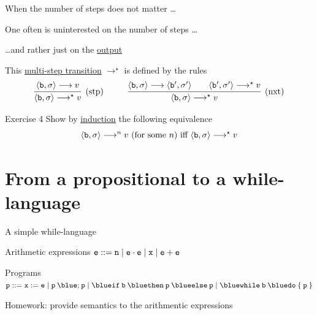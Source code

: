 \documentclass{beamer}
\begin{document}
\begin{frame}{When the number of steps does not matter \dots}

        One often is uninterested on the number of steps \dots

        \dots and rather just on the \alert{\underline{output}}

        \pause
        \bigskip
        This \alert{\underline{multi-step transition}}  $\longrightarrow^\star$
        is defined by the rules 
        \smallskip
        \[
                \infer[\text{(stp)}]{ 
                        \pv{\prog{b}}{\sigma} \longrightarrow^\star v 
                }{
                        \pv{\prog{b}}{\sigma} \longrightarrow v 
                }
                \hspace{1cm}
                \infer[\text{(nxt)}]{ 
                        \pv{\prog{b}}{\sigma} \longrightarrow^\star v 
                }{
                        \pv{\prog{b}}{\sigma} \longrightarrow 
                        \pv{\prog{b'}}{\sigma'} 
                        \qquad
                        \pv{\prog{b'}}{\sigma'} \longrightarrow^\star v
                }
        \]

\end{frame}

\begin{frame}{Exercise 4}
        Show by \alert{\underline{induction}} the following 
        equivalence
        \[
                \langle \mathtt{b}, \sigma \rangle \longrightarrow^n v\
                 (\text{for some } n)
                \text{ iff }
                \langle \mathtt{b}, \sigma \rangle \longrightarrow^\star v 
       \]
\end{frame}

\section{From a propositional to a while-language}

\begin{frame}{A simple while-language}

        \vspace{0.7cm}
	\begin{block}{Arithmetic expressions}
        $\mathtt{e} ::=  \mathtt{n}  \mid \mathtt{e \cdot e}
        \mid  \mathtt{x}  \mid \mathtt{e + e}$
	\end{block}

	\vspace{0.7cm}
	\begin{block}{Programs}
        $\prog{p} ::= \mathtt{x} := \mathtt{e} \mid
	\mathtt{p \> {\blue ;} \> p} \mid
	\mathtt{{\blue if} \> b \> {\blue then} \> p \> {\blue else} \> p} \mid
	\mathtt{{\blue while} \> b \> {\blue do} \> \{ \> p \> \}}$
	\end{block}

        \vfill
        \pause
        Homework: provide semantics to the arithmentic expressions
\end{frame}
\end{document}
